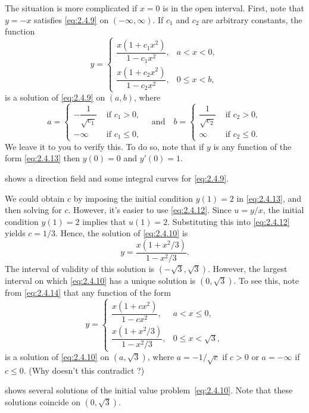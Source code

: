 \begin{alistSolution}
The situation is more complicated if $x=0$ is in the open interval.
 First, note that $y=-x$ satisfies \eqref{eq:2.4.9}
on $(-\infty,\infty)$. If $c_1$ and $c_2$ are arbitrary constants,
 the function
\begin{equation} \label{eq:2.4.14}
y=\begin{cases}
\dfrac{x(1+c_1x^2)}{1-c_1x^2},&a<x<0,\\
\dfrac{x(1+c_2x^2)}{1-c_2x^2},&0\le x<b,
\end{cases}
\end{equation}
is a solution of \eqref{eq:2.4.9} on $(a,b)$, where
\[
a=\begin{cases}
-\dfrac{1}{\sqrt{c_1}}&\text{ if }c_1>0,\\
-\infty&\text{ if }c_1\le 0,
\end{cases}
\quad\text{and}\quad
b=\begin{cases}
\dfrac{1}{\sqrt{c_2}}&\text{ if }c_2>0,\\
\infty&\text{ if }c_2\le 0.
\end{cases}
\]
We leave it to you to verify this. To do so, note that if $y$ is
any function of the form \eqref{eq:2.4.13} then $y(0)=0$ and $y'(0)=1$.


 shows a direction field and some integral curves
for \eqref{eq:2.4.9}.

\item  We could obtain $c$ by imposing
the initial condition $y(1)=2$ in \eqref{eq:2.4.13}, and then solving for
$c$. However, it's easier to use \eqref{eq:2.4.12}. Since $u=y/x$, the
initial
condition
$y(1)=2$ implies that $u(1)=2$.  Substituting this into \eqref{eq:2.4.12}
yields $c=1/3$.  Hence, the solution of \eqref{eq:2.4.10} is
\[
y=\frac{x(1+x^2/3)}{1-x^2/3}.
\]
The interval of validity of this solution is $(-\sqrt3,\sqrt3)$.
However, the largest interval on which \eqref{eq:2.4.10} has a unique
solution is $(0,\sqrt3)$. To see this, note from \eqref{eq:2.4.14}
that any function of the form
\begin{equation} \label{eq:2.4.15}
y=
\begin{cases}
\dfrac{x(1+cx^2)}{1-cx^2},&a<x\le0,\\
\dfrac{x(1+x^2/3)}{1-x^2/3},&0\le x<\sqrt3,
\end{cases}
\end{equation}
is a solution of \eqref{eq:2.4.10} on $(a,\sqrt3)$, where $a=-1/\sqrt c$
if $c>0$ or $a=-\infty$ if $c\le0$. (Why doesn't this contradict
?)


 shows several solutions of the
initial value problem~\eqref{eq:2.4.10}. Note that these solutions coincide
on $(0,\sqrt{3})$.
\end{alistSolution}


